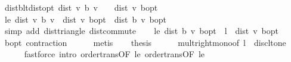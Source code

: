 \begin{isabellebody}
\isamarkupfalse%
%
\endisatagproof
{\isafoldproof}%
%
\isadelimproof
\isanewline
%
\endisadelimproof
\isanewline
{}\isamarkupfalse%
\ dist{\isacharunderscore}{\kern0pt}{\isasymL}\isactrlsub b{\isacharunderscore}{\kern0pt}lt{\isacharunderscore}{\kern0pt}dist{\isacharunderscore}{\kern0pt}opt{\isacharcolon}{\kern0pt}\ {\isachardoublequoteopen}dist\ v\ {\isacharparenleft}{\kern0pt}{\isasymL}\isactrlsub b\ v{\isacharparenright}{\kern0pt}\ {\isasymle}\ {}\ {\isacharasterisk}{\kern0pt}\ dist\ v\ {\isasymnu}\isactrlsub b{\isacharunderscore}{\kern0pt}opt{\isachardoublequoteclose}\isanewline
%
\isadelimproof
%
\endisadelimproof
%
\isatagproof
{}\isamarkupfalse%
\ {\isacharminus}{\kern0pt}\isanewline
\ \ \isamarkupfalse%
\ le{}{\isacharcolon}{\kern0pt}\ {\isachardoublequoteopen}dist\ v\ {\isacharparenleft}{\kern0pt}{\isasymL}\isactrlsub b\ v{\isacharparenright}{\kern0pt}\ {\isasymle}\ dist\ v\ {\isasymnu}\isactrlsub b{\isacharunderscore}{\kern0pt}opt\ {\isacharplus}{\kern0pt}\ dist\ {\isacharparenleft}{\kern0pt}{\isasymL}\isactrlsub b\ v{\isacharparenright}{\kern0pt}\ {\isasymnu}\isactrlsub b{\isacharunderscore}{\kern0pt}opt{\isachardoublequoteclose}\isanewline
\ \ \ \ \isamarkupfalse%
\ {\isacharparenleft}{\kern0pt}simp\ add{\isacharcolon}{\kern0pt}\ dist{\isacharunderscore}{\kern0pt}triangle\ dist{\isacharunderscore}{\kern0pt}commute{\isacharparenright}{\kern0pt}\isanewline
\ \ \isamarkupfalse%
\ le{}{\isacharcolon}{\kern0pt}\ {\isachardoublequoteopen}dist\ {\isacharparenleft}{\kern0pt}{\isasymL}\isactrlsub b\ v{\isacharparenright}{\kern0pt}\ {\isasymnu}\isactrlsub b{\isacharunderscore}{\kern0pt}opt\ {\isasymle}\ l\ {\isacharasterisk}{\kern0pt}\ dist\ v\ {\isasymnu}\isactrlsub b{\isacharunderscore}{\kern0pt}opt{\isachardoublequoteclose}\isanewline
\ \ \ \ \isamarkupfalse%
\ {\isasymL}\isactrlsub b{\isacharunderscore}{\kern0pt}opt\ contraction{\isacharunderscore}{\kern0pt}{\isasymL}\isanewline
\ \ \ \ \isamarkupfalse%
\ metis\isanewline
\ \ \isamarkupfalse%
\ {\isacharquery}{\kern0pt}thesis\isanewline
\ \ \ \ \isamarkupfalse%
\ mult{\isacharunderscore}{\kern0pt}right{\isacharunderscore}{\kern0pt}mono{\isacharbrackleft}{\kern0pt}of\ l\ {}{\isacharbrackright}{\kern0pt}\ disc{\isacharunderscore}{\kern0pt}lt{\isacharunderscore}{\kern0pt}one\ \isanewline
\ \ \ \ \isamarkupfalse%
\ {\isacharparenleft}{\kern0pt}fastforce\ intro{\isacharbang}{\kern0pt}{\isacharcolon}{\kern0pt}\ order{\isachardot}{\kern0pt}trans{\isacharbrackleft}{\kern0pt}OF\ le{}{\isacharbrackright}{\kern0pt}\ order{\isachardot}{\kern0pt}trans{\isacharbrackleft}{\kern0pt}OF\ le{}{\isacharbrackright}{\kern0pt}{\isacharparenright}{\kern0pt}\isanewline

\end{isabellebody}
